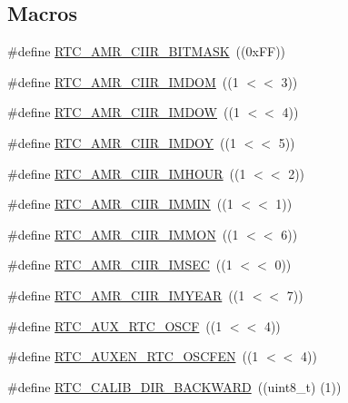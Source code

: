 \subsection*{Macros}
\begin{DoxyCompactItemize}
\item 
\#define \hyperlink{group__RTC__17XX__40XX_gafcc754fba01521c5aa4f1775b889e894}{R\+T\+C\+\_\+\+A\+M\+R\+\_\+\+C\+I\+I\+R\+\_\+\+B\+I\+T\+M\+A\+SK}~((0x\+F\+F))
\item 
\#define \hyperlink{group__RTC__17XX__40XX_gacd23cffe1367b6bb612fb37ebdf2e279}{R\+T\+C\+\_\+\+A\+M\+R\+\_\+\+C\+I\+I\+R\+\_\+\+I\+M\+D\+OM}~((1 $<$$<$ 3))
\item 
\#define \hyperlink{group__RTC__17XX__40XX_ga6494d5878d87398a4519e90a367bffe5}{R\+T\+C\+\_\+\+A\+M\+R\+\_\+\+C\+I\+I\+R\+\_\+\+I\+M\+D\+OW}~((1 $<$$<$ 4))
\item 
\#define \hyperlink{group__RTC__17XX__40XX_gaec7d51e7a503514c1d71bf9428c6f3e8}{R\+T\+C\+\_\+\+A\+M\+R\+\_\+\+C\+I\+I\+R\+\_\+\+I\+M\+D\+OY}~((1 $<$$<$ 5))
\item 
\#define \hyperlink{group__RTC__17XX__40XX_ga4e20983ef05abf10773186d3193270f9}{R\+T\+C\+\_\+\+A\+M\+R\+\_\+\+C\+I\+I\+R\+\_\+\+I\+M\+H\+O\+UR}~((1 $<$$<$ 2))
\item 
\#define \hyperlink{group__RTC__17XX__40XX_ga3d67e7c72ec7bcd0831628841496cbc6}{R\+T\+C\+\_\+\+A\+M\+R\+\_\+\+C\+I\+I\+R\+\_\+\+I\+M\+M\+IN}~((1 $<$$<$ 1))
\item 
\#define \hyperlink{group__RTC__17XX__40XX_ga841dfecc952d8b6d275e799cb9e89c02}{R\+T\+C\+\_\+\+A\+M\+R\+\_\+\+C\+I\+I\+R\+\_\+\+I\+M\+M\+ON}~((1 $<$$<$ 6))
\item 
\#define \hyperlink{group__RTC__17XX__40XX_ga30c785b6017020d4c0b61b22aff30aac}{R\+T\+C\+\_\+\+A\+M\+R\+\_\+\+C\+I\+I\+R\+\_\+\+I\+M\+S\+EC}~((1 $<$$<$ 0))
\item 
\#define \hyperlink{group__RTC__17XX__40XX_ga56b312d9e291685d843f6dae171f4441}{R\+T\+C\+\_\+\+A\+M\+R\+\_\+\+C\+I\+I\+R\+\_\+\+I\+M\+Y\+E\+AR}~((1 $<$$<$ 7))
\item 
\#define \hyperlink{group__RTC__17XX__40XX_gaafb1215dfd0f9bbe198274689a1f1584}{R\+T\+C\+\_\+\+A\+U\+X\+\_\+\+R\+T\+C\+\_\+\+O\+S\+CF}~((1 $<$$<$ 4))
\item 
\#define \hyperlink{group__RTC__17XX__40XX_ga12b8af6f1d4757d19c1b09d85d3fc497}{R\+T\+C\+\_\+\+A\+U\+X\+E\+N\+\_\+\+R\+T\+C\+\_\+\+O\+S\+C\+F\+EN}~((1 $<$$<$ 4))
\item 
\#define \hyperlink{group__RTC__17XX__40XX_ga0a3b0243c2fd9528066365ef74c45cf4}{R\+T\+C\+\_\+\+C\+A\+L\+I\+B\+\_\+\+D\+I\+R\+\_\+\+B\+A\+C\+K\+W\+A\+RD}~((uint8\+\_\+t) (1))

\end{DoxyCompactItemize}
